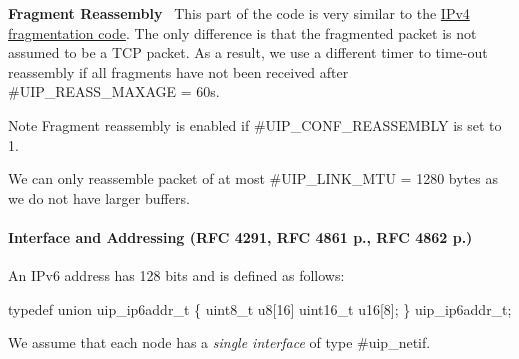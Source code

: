 {\bfseries Fragment Reassembly}~\newline
 This part of the code is very similar to the \hyperlink{a00074_ipreass}{I\+Pv4 fragmentation code}. The only difference is that the fragmented packet is not assumed to be a T\+CP packet. As a result, we use a different timer to time-\/out reassembly if all fragments have not been received after \#\+U\+I\+P\+\_\+\+R\+E\+A\+S\+S\+\_\+\+M\+A\+X\+A\+GE = 60s. \begin{DoxyNote}{Note}
Fragment reassembly is enabled if \#\+U\+I\+P\+\_\+\+C\+O\+N\+F\+\_\+\+R\+E\+A\+S\+S\+E\+M\+B\+LY is set to 1. 

We can only reassemble packet of at most \#\+U\+I\+P\+\_\+\+L\+I\+N\+K\+\_\+\+M\+TU = 1280 bytes as we do not have larger buffers.
\end{DoxyNote}
\hypertarget{a00075_address}{}\paragraph{Interface and Addressing (\+R\+F\+C 4291, R\+F\+C 4861 p., R\+F\+C 4862 p.)}\label{a00075_address}
An I\+Pv6 address has 128 bits and is defined as follows\+: 
\begin{DoxyCode}
\textcolor{keyword}{typedef} \textcolor{keyword}{union }uip\_ip6addr\_t \{
  uint8\_t  u8[16]
  uint16\_t u16[8];
\} uip\_ip6addr\_t;
\end{DoxyCode}


We assume that each node has a {\itshape single interface} of type \#uip\+\_\+netif.

